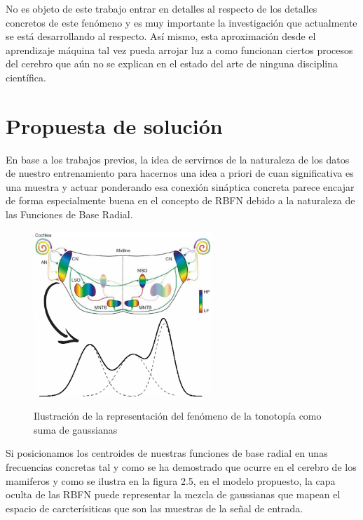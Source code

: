 \documentclass[10pt,a4paper]{report}
\begin{document}
No es objeto de este trabajo entrar en detalles al respecto de los detalles concretos de este fenómeno y es muy importante la investigación que actualmente se está desarrollando al respecto. Así mismo, esta aproximación desde el aprendizaje máquina tal vez pueda arrojar luz a como funcionan ciertos procesos del cerebro que aún no se explican en el estado del arte de ninguna disciplina científica.

\section{Propuesta de solución}
En base a los trabajos previos, la idea de servirnos de la naturaleza de los datos de nuestro entrenamiento para hacernos una idea a priori de cuan significativa es una muestra y actuar ponderando esa conexión sináptica concreta parece encajar de forma especialmente buena en el concepto de RBFN debido a la naturaleza de las Funciones de Base Radial. 

\begin{figure}[hb!]{}
    \centering
    \includegraphics[width=0.6\textwidth]{img/esquemaPropuesta1.jpg}
    \label{fig:Esquemapropuesta1}
    \caption{Ilustración de la representación del fenómeno de la tonotopía como suma de gaussianas}
\end{figure}

Si posicionamos los centroides de nuestras funciones de base radial en unas frecuencias concretas tal y como se ha demostrado que ocurre en el cerebro de los mamiferos y como se ilustra en la figura 2.5, en el modelo propuesto, la capa oculta de las RBFN puede representar la mezcla de gaussianas que mapean el espacio de carcterísiticas que son las muestras de la señal de entrada. 
\end{document}
